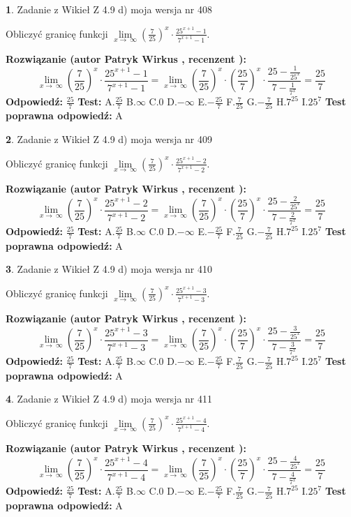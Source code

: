 \documentclass[12pt, a4paper]{article}
\theoremstyle{definition} %
\newtheorem{zad}{}
\newcommand{\zadStart}[1]{\begin{zad}#1\newline}
\newcommand{\zadStop}{\end{zad}}
\newcommand{\rozwStart}[2]{\noindent \textbf{Rozwiązanie (autor #1 , recenzent #2): }\newline}
\newcommand{\rozwStop}{\newline}
\newcommand{\odpStart}{\noindent \textbf{Odpowiedź:}\newline}
\newcommand{\odpStop}{\newline}
\newcommand{\testStart}{\noindent \textbf{Test:}\newline}
\newcommand{\testStop}{\newline}
\newcommand{\kluczStart}{\noindent \textbf{Test poprawna odpowiedź:}\newline}
\newcommand{\kluczStop}{\newline}
\begin{document}
\zadStart{Zadanie z Wikieł Z 4.9 d) moja wersja nr 408}


Obliczyć granicę funkcji  $\lim\limits_{x\to\ \infty}(\frac{7}{25})^{x}\cdot\frac{25^{x+1}-1}{7^{x+1}-1}$.
\zadStop
\rozwStart{Patryk Wirkus}{}
$$\lim\limits_{x\to\ \infty}(\frac{7}{25})^{x}\cdot\frac{25^{x+1}-1}{7^{x+1}-1}=\lim\limits_{x\to\ \infty}(\frac{7}{25})^{x}\cdot(\frac{25}{7})^{x} \cdot \frac{25-\frac{1}{25^{x}}}{7-\frac{1}{7^{x}}} = \frac{25}{7}$$
\rozwStop
\odpStart
$\frac{25}{7}$
\odpStop
\testStart
A.$\frac{25}{7}$ B.$\infty$ C.$0$ D.$-\infty$ E.$-\frac{25}{7}$
F.$\frac{7}{25}$ G.$-\frac{7}{25}$
H.$7^{25}$
I.$25^{7}$
\testStop
\kluczStart
A
\kluczStop



\zadStart{Zadanie z Wikieł Z 4.9 d) moja wersja nr 409}


Obliczyć granicę funkcji  $\lim\limits_{x\to\ \infty}(\frac{7}{25})^{x}\cdot\frac{25^{x+1}-2}{7^{x+1}-2}$.
\zadStop
\rozwStart{Patryk Wirkus}{}
$$\lim\limits_{x\to\ \infty}(\frac{7}{25})^{x}\cdot\frac{25^{x+1}-2}{7^{x+1}-2}=\lim\limits_{x\to\ \infty}(\frac{7}{25})^{x}\cdot(\frac{25}{7})^{x} \cdot \frac{25-\frac{2}{25^{x}}}{7-\frac{2}{7^{x}}} = \frac{25}{7}$$
\rozwStop
\odpStart
$\frac{25}{7}$
\odpStop
\testStart
A.$\frac{25}{7}$ B.$\infty$ C.$0$ D.$-\infty$ E.$-\frac{25}{7}$
F.$\frac{7}{25}$ G.$-\frac{7}{25}$
H.$7^{25}$
I.$25^{7}$
\testStop
\kluczStart
A
\kluczStop



\zadStart{Zadanie z Wikieł Z 4.9 d) moja wersja nr 410}


Obliczyć granicę funkcji  $\lim\limits_{x\to\ \infty}(\frac{7}{25})^{x}\cdot\frac{25^{x+1}-3}{7^{x+1}-3}$.
\zadStop
\rozwStart{Patryk Wirkus}{}
$$\lim\limits_{x\to\ \infty}(\frac{7}{25})^{x}\cdot\frac{25^{x+1}-3}{7^{x+1}-3}=\lim\limits_{x\to\ \infty}(\frac{7}{25})^{x}\cdot(\frac{25}{7})^{x} \cdot \frac{25-\frac{3}{25^{x}}}{7-\frac{3}{7^{x}}} = \frac{25}{7}$$
\rozwStop
\odpStart
$\frac{25}{7}$
\odpStop
\testStart
A.$\frac{25}{7}$ B.$\infty$ C.$0$ D.$-\infty$ E.$-\frac{25}{7}$
F.$\frac{7}{25}$ G.$-\frac{7}{25}$
H.$7^{25}$
I.$25^{7}$
\testStop
\kluczStart
A
\kluczStop



\zadStart{Zadanie z Wikieł Z 4.9 d) moja wersja nr 411}


Obliczyć granicę funkcji  $\lim\limits_{x\to\ \infty}(\frac{7}{25})^{x}\cdot\frac{25^{x+1}-4}{7^{x+1}-4}$.
\zadStop
\rozwStart{Patryk Wirkus}{}
$$\lim\limits_{x\to\ \infty}(\frac{7}{25})^{x}\cdot\frac{25^{x+1}-4}{7^{x+1}-4}=\lim\limits_{x\to\ \infty}(\frac{7}{25})^{x}\cdot(\frac{25}{7})^{x} \cdot \frac{25-\frac{4}{25^{x}}}{7-\frac{4}{7^{x}}} = \frac{25}{7}$$
\rozwStop
\odpStart
$\frac{25}{7}$
\odpStop
\testStart
A.$\frac{25}{7}$ B.$\infty$ C.$0$ D.$-\infty$ E.$-\frac{25}{7}$
F.$\frac{7}{25}$ G.$-\frac{7}{25}$
H.$7^{25}$
I.$25^{7}$
\testStop
\kluczStart
A
\kluczStop
\end{document}

